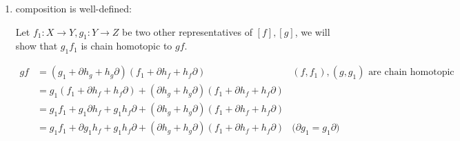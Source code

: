 \documentclass{article}
\begin{document}
\begin{longproof}
\begin{enumerate}
    \item composition is well-defined:
    
    Let $f_1: X \to Y, g_1: Y \to Z$ be two other representatives of $[f], [g]$, we will show that $g_1 f_1$ is chain homotopic to $gf$.

    \begin{center}
    \end{center}

    \begin{align*}
        gf
        &= (g_1 + \partial h_g + h_g \partial)(f_1 + \partial h_f + h_f \partial) &\text{$(f, f_1), (g, g_1)$ are chain homotopic}\\
        &= g_1 (f_1 + \partial h_f + h_f \partial) + (\partial h_g + h_g \partial)(f_1 + \partial h_f + h_f \partial) \\
        &= g_1 f_1 + g_1 \partial h_f + g_1 h_f \partial + (\partial h_g + h_g \partial)(f_1 + \partial h_f + h_f \partial) \\
        &= g_1 f_1 + \partial g_1 h_f + g_1 h_f \partial + (\partial h_g + h_g \partial)(f_1 + \partial h_f + h_f \partial) &\text{($\partial g_1 = g_1 \partial$)}
    \end{align*}


\end{enumerate}
\end{longproof}
\end{document}
